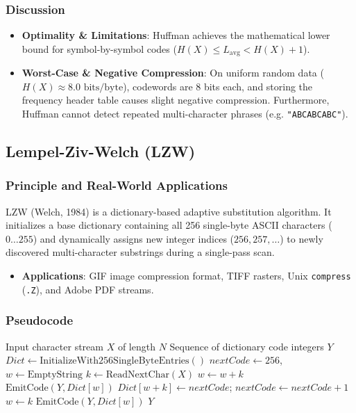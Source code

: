 \documentclass[12pt,a4paper]{article}
\begin{document}
\subsubsection{Discussion}
\begin{itemize}
    \item \textbf{Optimality \& Limitations}: Huffman achieves the mathematical lower bound for symbol-by-symbol codes ($H(X) \le L_{\text{avg}} < H(X) + 1$).
    \item \textbf{Worst-Case \& Negative Compression}: On uniform random data ($H(X) \approx 8.0\text{ bits/byte}$), codewords are 8 bits each, and storing the frequency header table causes slight negative compression. Furthermore, Huffman cannot detect repeated multi-character phrases (e.g. \texttt{"ABCABCABC"}).
\end{itemize}

\subsection{Lempel-Ziv-Welch (LZW)}

\subsubsection{Principle and Real-World Applications}
LZW (Welch, 1984) is a dictionary-based adaptive substitution algorithm. It initializes a base dictionary containing all 256 single-byte ASCII characters ($0 \dots 255$) and dynamically assigns new integer indices ($256, 257, \dots$) to newly discovered multi-character substrings during a single-pass scan.
\begin{itemize}
    \item \textbf{Applications}: GIF image compression format, TIFF rasters, Unix \texttt{compress} (\texttt{.Z}), and Adobe PDF streams.
\end{itemize}

\subsubsection{Pseudocode}
\begin{algorithm}[H]
\caption{LZW Dictionary-Based Compression}
\begin{algorithmic}[1]
\Require Input character stream $X$ of length $N$
\Ensure Sequence of dictionary code integers $Y$
\State $Dict \gets \text{InitializeWith256SingleByteEntries}()$
\State $nextCode \gets 256$, $w \gets \text{EmptyString}$
    \State $k \gets \text{ReadNextChar}(X)$
        \State $w \gets w + k$
    \Else
        \State $\text{EmitCode}(Y, Dict[w])$
            \State $Dict[w + k] \gets nextCode$; $nextCode \gets nextCode + 1$
        \EndIf
        \State $w \gets k$
    \EndIf
\EndWhile
{} $\text{EmitCode}(Y, Dict[w])$ \EndIf
\State \Return $Y$
\end{algorithmic}
\end{algorithm}
\end{document}
